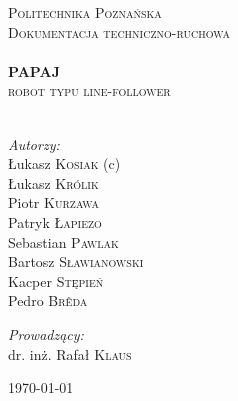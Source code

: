 \begin{titlepage}
\begin{center}


\textsc{\LARGE Politechnika Poznańska}\\[1.5cm]

\textsc{\Large Dokumentacja techniczno-ruchowa}\\[0.5cm]

\HRule \\[0.4cm]
{ \huge \bfseries PAPAJ \\[0.4cm] }
\textsc{\Large robot typu line-follower}\\[0.5cm]

\HRule \\[1.5cm]

\noindent
\begin{minipage}[t]{0.4\textwidth}
\begin{flushleft} \large
\emph{Autorzy:}\\
Łukasz \textsc{Kosiak} (c)\\
Łukasz \textsc{Królik} \\
Piotr \textsc{Kurzawa} \\
Patryk \textsc{Łapiezo} \\
Sebastian \textsc{Pawlak} \\
Bartosz \textsc{Sławianowski} \\
Kacper \textsc{Stępień} \\
Pedro \textsc{Brêda}
\end{flushleft}
\end{minipage}%
\begin{minipage}[t]{0.4\textwidth}
\begin{flushright} \large
\emph{Prowadzący:} \\
dr. inż. Rafał \textsc{Klaus}
\end{flushright}
\end{minipage}

\vfill

{\large \today}

\end{center}
\end{titlepage}